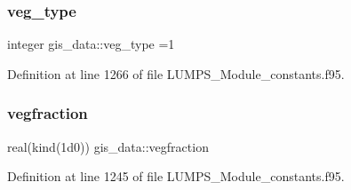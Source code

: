 \subsubsection{\texorpdfstring{veg\+\_\+type}{veg\_type}}
{\footnotesize\ttfamily integer gis\+\_\+data\+::veg\+\_\+type =1}



Definition at line 1266 of file L\+U\+M\+P\+S\+\_\+\+Module\+\_\+constants.\+f95.

\mbox{\label{namespacegis__data_a092cc07d2d55535e1995ac1196dac36a}} 
\subsubsection{\texorpdfstring{vegfraction}{vegfraction}}
{\footnotesize\ttfamily real(kind(1d0)) gis\+\_\+data\+::vegfraction}



Definition at line 1245 of file L\+U\+M\+P\+S\+\_\+\+Module\+\_\+constants.\+f95.

